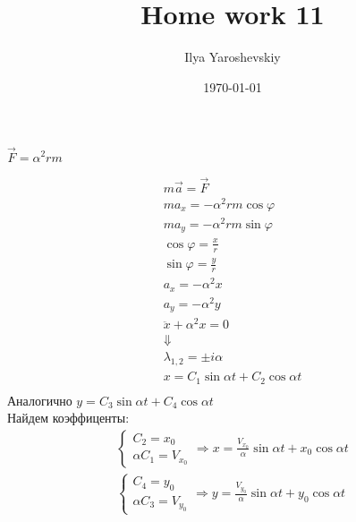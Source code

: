 \documentclass{article}
\author{Ilya Yaroshevskiy}
\date{\today}
\title{Home work 11}
\begin{document}
\maketitle
\tableofcontents


\section{}
\label{sec:org75e097c}
\(\overrightarrow{F} = \alpha^2rm\)

\begin{gather*}
m\overrightarrow{a} = \overrightarrow{F} \\
ma_x = -\alpha^2rm\cos{\varphi} \\
ma_y = -\alpha^2rm\sin{\varphi} \\
\cos{\varphi} = \frac{x}{r} \\
\sin{\varphi} = \frac{y}{r} \\
a_x = -\alpha^2x \\
a_y = -\alpha^2y  \\
\ddot{x} + \alpha^2x = 0 \\
\Downarrow \\
\lambda_{1,2} = \pm i\alpha \\
x = C_1\sin{\alpha t} + C_2\cos{\alpha t} \\
\end{gather*}
Аналогично \(y = C_3\sin{\alpha t} + C_4\cos{\alpha t}\) \\
Найдем коэффиценты: 
\begin{gather*}
\begin{cases}
C_2 = x_0 \\
\alpha C_1 = V_{x_0}
\end{cases} \Rightarrow
x = \frac{V_{x_0}}{\alpha}\sin{\alpha t} + x_0\cos{\alpha t} \\
\begin{cases}
C_4 = y_0 \\
\alpha C_3 = V_{y_0}
\end{cases} \Rightarrow
y = \frac{V_{y_0}}{\alpha}\sin{\alpha t} + y_0\cos{\alpha t} \\
\end{gather*}
\end{document}
